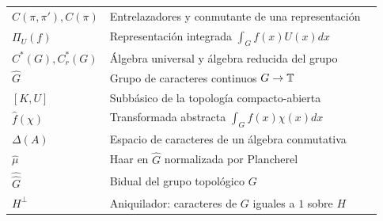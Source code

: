 \begin{longtable}{@{}p{}p{}r@{}}
$C(\pi,\pi'),C(\pi)$ & Entrelazadores y conmutante de una representación & \pageref{cap:v4-13}\\
$\Pi_U(f)$ & Representación integrada $\int_G f(x)U(x)dx$ & \pageref{v4-l24-p:integral}\\
$C^*(G),C_r^*(G)$ & Álgebra universal y álgebra reducida del grupo & \pageref{v4-l24-d:cstar}\\
$\widehat G$ & Grupo de caracteres continuos $G\to\mathbb T$ & \pageref{cap:v4-14}\\
$[K,U]$ & Subbásico de la topología compacto-abierta & \pageref{cap:v4-14}\\
$\widehat f(\chi)$ & Transformada abstracta $\int_Gf(x)\chi(x)dx$ & \pageref{cap:v4-15}\\
$\Delta(A)$ & Espacio de caracteres de un álgebra conmutativa & \pageref{cap:v4-15}\\
$\widehat\mu$ & Haar en $\widehat G$ normalizada por Plancherel & \pageref{v4:haar-dual}\\
$\widehat{\widehat G}$ & Bidual del grupo topológico $G$ & \pageref{v4:pontryagin}\\
$H^\perp$ & Aniquilador: caracteres de $G$ iguales a $1$ sobre $H$ & \pageref{v4:doble-aniquilador}\\
\end{longtable}
\normalsize
